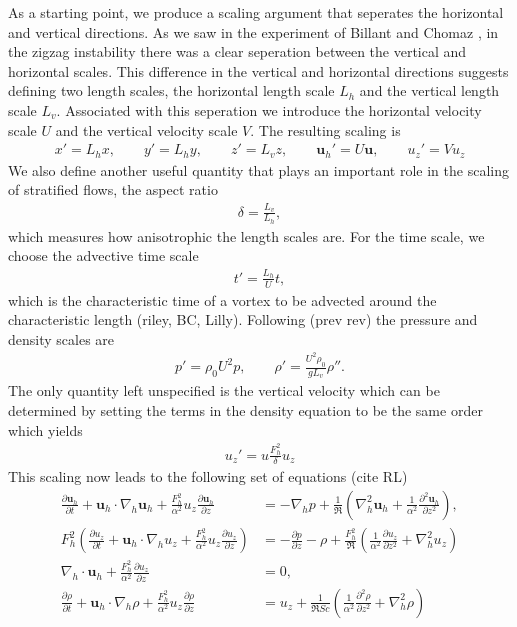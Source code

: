 As a starting point, we produce a scaling argument that seperates the horizontal and vertical directions. As we saw in the experiment of Billant and Chomaz \cite{bc2000a}, in the zigzag instability there was a clear seperation between the vertical and horizontal scales. This difference in the vertical and horizontal directions suggests defining two length scales, the horizontal length scale $L_{h}$ and the vertical length scale $L_{v}$. Associated with this seperation we introduce the horizontal velocity scale $U$ and the vertical velocity scale $V$. The resulting scaling is
\begin{align}
x'=L_{h}x,\qquad y' =L_{h}y, \qquad z'=L_{v}z, \qquad \textbf{u}_{h}' = U\textbf{u}, \qquad u_{z}' = Vu_{z}
\end{align}
We also define another useful quantity that plays an important role in the scaling of stratified flows, the aspect ratio
\begin{align}
\delta = \frac{L_{v}}{L_{h}},
\end{align}
which measures how anisotrophic the length scales are. For the time scale, we choose the advective time scale 
\begin{align}
t' = \frac{L_{h}}{U}t,
\end{align}
which is the characteristic time of a vortex to be advected around the characteristic length (riley, BC, Lilly). Following (prev rev) the pressure and density scales are
\begin{align}
p' = \rho_{0}U^{2}p, \qquad \rho' = \frac{U^{2}\rho_{0}}{gL_{v}}\rho''.
\end{align}
The only quantity left unspecified is the vertical velocity which can be determined by setting the terms in the density equation to be the same order which yields
\begin{align}
u_{z}' = u\frac{F_{h}^{2}}{\delta}u_{z}
\end{align}
This scaling now leads to the following set of equations (cite RL)
\begin{align}
\frac{\partial \textbf{u}_{h}}{\partial t} + \textbf{u}_{h}\cdot\nabla_{h}\textbf{u}_{h}+\frac{F_{h}^{2}}{\alpha^{2}}u_{z}\frac{\partial \textbf{u}_{h}}{\partial z} &= -\nabla_{h}p + \frac{1}{\Re}\left(\nabla^{2}_{h}\textbf{u}_{h}+\frac{1}{\alpha^{2}}\frac{\partial^{2}\textbf{u}_{h}}{\partial z^{2}}\right),\\
F_{h}^{2}\left(\frac{\partial u_{z}}{\partial t} + \textbf{u}_{h}\cdot\nabla_{h}u_{z}+\frac{F_{h}^{2}}{\alpha^{2}}u_{z}\frac{\partial u_{z}}{\partial z}\right) &= -\frac{\partial p}{\partial z} - \rho + \frac{F_{h}^{2}}{\Re}\left(\frac{1}{\alpha^{2}}\frac{\partial u_{z}}{\partial z^{2}} + \nabla^{2}_{h}u_{z}\right)\\
\nabla_{h}\cdot\textbf{u}_{h} + \frac{F_{h}^{2}}{\alpha^{2}}\frac{\partial u_{z}}{\partial z} &=0,\\
\frac{\partial \rho}{\partial t} + \textbf{u}_{h}\cdot\nabla_{h}\rho + \frac{F_{h}^{2}}{\alpha^{2}}u_{z}\frac{\partial \rho}{\partial z} &= u_{z} + \frac{1}{\Re Sc}\left(\frac{1}{\alpha^{2}}\frac{\partial^{2}\rho}{\partial z^{2}} + \nabla^{2}_{h}\rho\right)
\end{align} 
